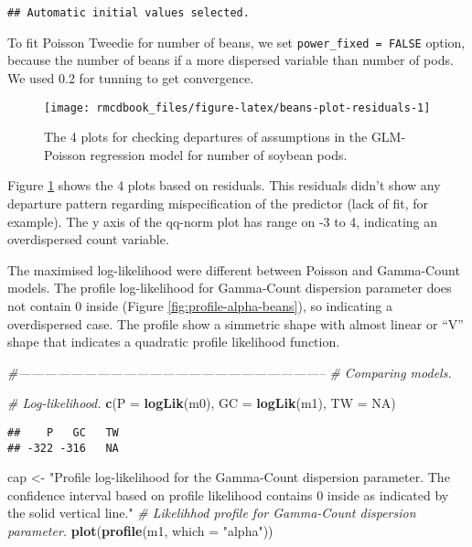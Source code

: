 \documentclass[9pt,a5paper,]{book}
\newenvironment{Shaded}{}{}
\newcommand{\KeywordTok}[1]{\textbf{{#1}}}
\newcommand{\DataTypeTok}[1]{\underline{{#1}}}
\newcommand{\StringTok}[1]{{#1}}
\newcommand{\CommentTok}[1]{\textit{{#1}}}
\newcommand{\OtherTok}[1]{{#1}}
\newcommand{\NormalTok}[1]{{#1}}
\renewenvironment{Shaded}{\color{inputcolor}}{}
\renewcommand{\DataTypeTok}[1]{{#1}}
\theoremstyle{definition}
\theoremstyle{definition}
\theoremstyle{remark}
\begin{document}
\begin{verbatim}
## Automatic initial values selected.
\end{verbatim}

To fit Poisson Tweedie for number of beans, we set
\texttt{power\_fixed\ =\ FALSE} option, because the number of beans if a
more dispersed variable than number of pods. We used 0.2 for tunning to
get convergence.

\begin{figure}[h]

{\centering \texttt{[image: rmcdbook\_files/figure-latex/beans-plot-residuals-1]} 

}

\caption{The 4 plots for checking departures of assumptions in the GLM-Poisson regression model for number of soybean pods.}\label{fig:beans-plot-residuals}
\end{figure}

Figure \ref{fig:beans-plot-residuals} shows the 4 plots based on
residuals. This residuals didn't show any departure pattern regarding
mispecification of the predictor (lack of fit, for example). The y axis
of the qq-norm plot has range on -3 to 4, indicating an overdispersed
count variable.

The maximised log-likelihood were different between Poisson and
Gamma-Count models. The profile log-likelihood for Gamma-Count
dispersion parameter does not contain 0 inside (Figure
\ref{fig:profile-alpha-beans}), so indicating a overdispersed case. The
profile show a simmetric shape with almost linear or ``V'' shape that
indicates a quadratic profile likelihood function.

\begin{Shaded}
\begin{Highlighting}[]
\CommentTok{#-----------------------------------------------------------------------}
\CommentTok{# Comparing models.}

\CommentTok{# Log-likelihood.}
\KeywordTok{c}\NormalTok{(}\DataTypeTok{P =} \KeywordTok{logLik}\NormalTok{(m0), }\DataTypeTok{GC =} \KeywordTok{logLik}\NormalTok{(m1), }\DataTypeTok{TW =} \OtherTok{NA}\NormalTok{)}
\end{Highlighting}
\end{Shaded}

\begin{verbatim}
##    P   GC   TW 
## -322 -316   NA
\end{verbatim}

\begin{Shaded}
\begin{Highlighting}[]
\NormalTok{cap <-}
\StringTok{    "Profile log-likelihood for the Gamma-Count dispersion parameter. The confidence interval based on profile likelihood contains 0 inside as indicated by the solid vertical line."}
\CommentTok{# Likelihhod profile for Gamma-Count dispersion parameter.}
\KeywordTok{plot}\NormalTok{(}\KeywordTok{profile}\NormalTok{(m1, }\DataTypeTok{which =} \StringTok{"alpha"}\NormalTok{))}
\end{Highlighting}
\end{Shaded}
\end{document}
